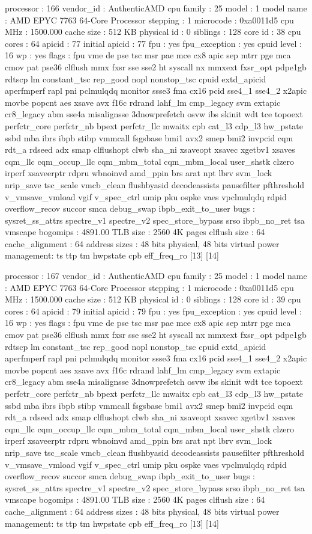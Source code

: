 processor	: 166
vendor_id	: AuthenticAMD
cpu family	: 25
model		: 1
model name	: AMD EPYC 7763 64-Core Processor
stepping	: 1
microcode	: 0xa0011d5
cpu MHz		: 1500.000
cache size	: 512 KB
physical id	: 0
siblings	: 128
core id		: 38
cpu cores	: 64
apicid		: 77
initial apicid	: 77
fpu		: yes
fpu_exception	: yes
cpuid level	: 16
wp		: yes
flags		: fpu vme de pse tsc msr pae mce cx8 apic sep mtrr pge mca cmov pat pse36 clflush mmx fxsr sse sse2 ht syscall nx mmxext fxsr_opt pdpe1gb rdtscp lm constant_tsc rep_good nopl nonstop_tsc cpuid extd_apicid aperfmperf rapl pni pclmulqdq monitor ssse3 fma cx16 pcid sse4_1 sse4_2 x2apic movbe popcnt aes xsave avx f16c rdrand lahf_lm cmp_legacy svm extapic cr8_legacy abm sse4a misalignsse 3dnowprefetch osvw ibs skinit wdt tce topoext perfctr_core perfctr_nb bpext perfctr_llc mwaitx cpb cat_l3 cdp_l3 hw_pstate ssbd mba ibrs ibpb stibp vmmcall fsgsbase bmi1 avx2 smep bmi2 invpcid cqm rdt_a rdseed adx smap clflushopt clwb sha_ni xsaveopt xsavec xgetbv1 xsaves cqm_llc cqm_occup_llc cqm_mbm_total cqm_mbm_local user_shstk clzero irperf xsaveerptr rdpru wbnoinvd amd_ppin brs arat npt lbrv svm_lock nrip_save tsc_scale vmcb_clean flushbyasid decodeassists pausefilter pfthreshold v_vmsave_vmload vgif v_spec_ctrl umip pku ospke vaes vpclmulqdq rdpid overflow_recov succor smca debug_swap ibpb_exit_to_user
bugs		: sysret_ss_attrs spectre_v1 spectre_v2 spec_store_bypass srso ibpb_no_ret tsa vmscape
bogomips	: 4891.00
TLB size	: 2560 4K pages
clflush size	: 64
cache_alignment	: 64
address sizes	: 48 bits physical, 48 bits virtual
power management: ts ttp tm hwpstate cpb eff_freq_ro [13] [14]

processor	: 167
vendor_id	: AuthenticAMD
cpu family	: 25
model		: 1
model name	: AMD EPYC 7763 64-Core Processor
stepping	: 1
microcode	: 0xa0011d5
cpu MHz		: 1500.000
cache size	: 512 KB
physical id	: 0
siblings	: 128
core id		: 39
cpu cores	: 64
apicid		: 79
initial apicid	: 79
fpu		: yes
fpu_exception	: yes
cpuid level	: 16
wp		: yes
flags		: fpu vme de pse tsc msr pae mce cx8 apic sep mtrr pge mca cmov pat pse36 clflush mmx fxsr sse sse2 ht syscall nx mmxext fxsr_opt pdpe1gb rdtscp lm constant_tsc rep_good nopl nonstop_tsc cpuid extd_apicid aperfmperf rapl pni pclmulqdq monitor ssse3 fma cx16 pcid sse4_1 sse4_2 x2apic movbe popcnt aes xsave avx f16c rdrand lahf_lm cmp_legacy svm extapic cr8_legacy abm sse4a misalignsse 3dnowprefetch osvw ibs skinit wdt tce topoext perfctr_core perfctr_nb bpext perfctr_llc mwaitx cpb cat_l3 cdp_l3 hw_pstate ssbd mba ibrs ibpb stibp vmmcall fsgsbase bmi1 avx2 smep bmi2 invpcid cqm rdt_a rdseed adx smap clflushopt clwb sha_ni xsaveopt xsavec xgetbv1 xsaves cqm_llc cqm_occup_llc cqm_mbm_total cqm_mbm_local user_shstk clzero irperf xsaveerptr rdpru wbnoinvd amd_ppin brs arat npt lbrv svm_lock nrip_save tsc_scale vmcb_clean flushbyasid decodeassists pausefilter pfthreshold v_vmsave_vmload vgif v_spec_ctrl umip pku ospke vaes vpclmulqdq rdpid overflow_recov succor smca debug_swap ibpb_exit_to_user
bugs		: sysret_ss_attrs spectre_v1 spectre_v2 spec_store_bypass srso ibpb_no_ret tsa vmscape
bogomips	: 4891.00
TLB size	: 2560 4K pages
clflush size	: 64
cache_alignment	: 64
address sizes	: 48 bits physical, 48 bits virtual
power management: ts ttp tm hwpstate cpb eff_freq_ro [13] [14]

